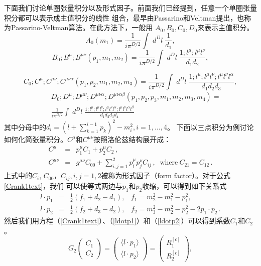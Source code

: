 下面我们讨论单圈张量积分以及形式因子。前面我们已经提到，任意一个单圈张量积分都可以表示成主值积分的线性
组合，最早由Passarino和Veltman提出，也称为Passarino-Veltman算法\cite{PVreduction}。在此方法下，一般用
$A_0,B_0,C_0,D_0$来表示主值积分。
\begin{equation}
A_0(m_1)= 
\frac{1}{i \pi^{D/2}}\int \; d^D l  \; \frac{1} {d_1},
\end{equation}
\begin{equation}
B_0;B^\mu;B^{\mu\nu}(p_1,m_1,m_2)= 
\frac{1}{i \pi^{D/2}}\int \; d^D l \;  \frac{1;l^\mu; l^\mu l^\nu} {d_1 d_2},
\end{equation}

\begin{equation}
\label{eq:Cint}
C_0;C^\mu;C^{\mu\nu};C^{\mu\nu\alpha}(p_1,p_2,m_1,m_2,m_3) = 
\frac{1}{i \pi^{D/2}}\int \; d^D l \;  \frac{1;l^\mu; l^\mu l^\nu; l^\mu l^\nu l^\alpha}{d_1 d_2 d_3 },
\end{equation}
\begin{eqnarray}
&&D_0;D^\mu;D^{\mu\nu};D^{\mu\nu\alpha};D^{\mu\nu\alpha\beta}(p_1,p_2,p_3,
m_1,m_2,m_3,m_4) = \nonumber \\
&&\frac{1}{i \pi^{D/2}}\int \; d^D l  \; 
\frac{1;l^\mu; l^\mu l^\nu; l^\mu l^\nu l^\alpha; l^\mu l^\nu l^\alpha l^\beta}{d_1 d_2 d_3 d_4 }
\end{eqnarray}
其中分母中的$d_i = (l+\sum\limits^{i-1}_{k=1}p_k)^2 - m^2_i, i=1,\ldots,4$。
下面以三点积分为例讨论如何化简张量积分。$C^{\mu}$和$C^{\mu\nu}$按照洛伦兹结构展开成：
\begin{eqnarray}
C^\mu &=& p_{1}^{\mu} C_1 +p_{2}^{\mu} C_2 \,, 
\label{Crank1text} \\
C^{\mu \nu} 
            &=& g^{\mu\nu} C_{00} + \sum_{i,j=1}^2 p_i^\mu p_j^\nu C_{ij}\,, \;\;
\mbox{where}~C_{21}=C_{12}\,. 
\label{Crank2text}
\end{eqnarray}
上式中的$C_i$, $C_{00}$，$C_{ij}, i,j=1,2$被称为形式因子（form factor）。对于公式\ref{Crank1text}，我们
可以使等式两边与$p_1$和$p_2$收缩，可以得到如下关系式
\begin{eqnarray}
l \cdot p_1 &=&  
\frac{1}{2} ( f_1+d_2 -d_1),\;\;\; f_1 = m_2^2-m_1^2-p_1^2, 
\label{ldotp1}  \\
l \cdot p_2 &=&  \frac{1}{2} ( f_2+d_3 -d_2),\;\;\; 
f_2 = m_3^2-m_2^2-p_2^2-2 p_1\cdot p_2\,. 
\label{ldotp2}
\end{eqnarray}
然后我们用方程（\ref{Crank1text}）、（\ref{ldotp1}）和（\ref{ldotp2}）可以得到系数$C_1$和$C_2$。
\begin{equation}
G_2 \left( \begin{array}{c} C_{1}\\
                            C_{2} \end{array}\right) =
\left( \begin{array}{c} \langle l \cdot p_1\rangle \\
                        \langle l \cdot p_2\rangle \end{array}\right) =
\left( \begin{array}{c} R^{[c]}_1\\
                        R^{[c]}_2 \end{array}\right),
\label{Cformfactoreq0}
\end{equation}
